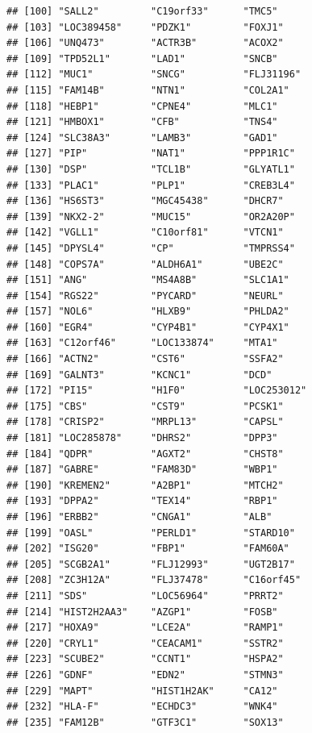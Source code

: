 \documentclass{article}\usepackage[]{graphicx}\usepackage[]{color}
\makeatletter
\newenvironment{kframe}{%
 \def\at@end@of@kframe{}%
 \ifinner\ifhmode%
  \def\at@end@of@kframe{\end{minipage}}%
  \begin{minipage}{\columnwidth}%
 \fi\fi%
 \def\FrameCommand##1{\hskip\@totalleftmargin \hskip-\fboxsep
 \colorbox{shadecolor}{##1}\hskip-\fboxsep
     \hskip-\linewidth \hskip-\@totalleftmargin \hskip\columnwidth}%
 \MakeFramed {\advance\hsize-\width
   \@totalleftmargin\z@ \linewidth\hsize
   \@setminipage}}%
 {\par\unskip\endMakeFramed%
 \at@end@of@kframe}
\newenvironment{knitrout}{}{} %
\makeatother
\begin{document}
\begin{knitrout}
\begin{kframe}
\begin{verbatim}
## [100] "SALL2"         "C19orf33"      "TMC5"         
## [103] "LOC389458"     "PDZK1"         "FOXJ1"        
## [106] "UNQ473"        "ACTR3B"        "ACOX2"        
## [109] "TPD52L1"       "LAD1"          "SNCB"         
## [112] "MUC1"          "SNCG"          "FLJ31196"     
## [115] "FAM14B"        "NTN1"          "COL2A1"       
## [118] "HEBP1"         "CPNE4"         "MLC1"         
## [121] "HMBOX1"        "CFB"           "TNS4"         
## [124] "SLC38A3"       "LAMB3"         "GAD1"         
## [127] "PIP"           "NAT1"          "PPP1R1C"      
## [130] "DSP"           "TCL1B"         "GLYATL1"      
## [133] "PLAC1"         "PLP1"          "CREB3L4"      
## [136] "HS6ST3"        "MGC45438"      "DHCR7"        
## [139] "NKX2-2"        "MUC15"         "OR2A20P"      
## [142] "VGLL1"         "C10orf81"      "VTCN1"        
## [145] "DPYSL4"        "CP"            "TMPRSS4"      
## [148] "COPS7A"        "ALDH6A1"       "UBE2C"        
## [151] "ANG"           "MS4A8B"        "SLC1A1"       
## [154] "RGS22"         "PYCARD"        "NEURL"        
## [157] "NOL6"          "HLXB9"         "PHLDA2"       
## [160] "EGR4"          "CYP4B1"        "CYP4X1"       
## [163] "C12orf46"      "LOC133874"     "MTA1"         
## [166] "ACTN2"         "CST6"          "SSFA2"        
## [169] "GALNT3"        "KCNC1"         "DCD"          
## [172] "PI15"          "H1F0"          "LOC253012"    
## [175] "CBS"           "CST9"          "PCSK1"        
## [178] "CRISP2"        "MRPL13"        "CAPSL"        
## [181] "LOC285878"     "DHRS2"         "DPP3"         
## [184] "QDPR"          "AGXT2"         "CHST8"        
## [187] "GABRE"         "FAM83D"        "WBP1"         
## [190] "KREMEN2"       "A2BP1"         "MTCH2"        
## [193] "DPPA2"         "TEX14"         "RBP1"         
## [196] "ERBB2"         "CNGA1"         "ALB"          
## [199] "OASL"          "PERLD1"        "STARD10"      
## [202] "ISG20"         "FBP1"          "FAM60A"       
## [205] "SCGB2A1"       "FLJ12993"      "UGT2B17"      
## [208] "ZC3H12A"       "FLJ37478"      "C16orf45"     
## [211] "SDS"           "LOC56964"      "PRRT2"        
## [214] "HIST2H2AA3"    "AZGP1"         "FOSB"         
## [217] "HOXA9"         "LCE2A"         "RAMP1"        
## [220] "CRYL1"         "CEACAM1"       "SSTR2"        
## [223] "SCUBE2"        "CCNT1"         "HSPA2"        
## [226] "GDNF"          "EDN2"          "STMN3"        
## [229] "MAPT"          "HIST1H2AK"     "CA12"         
## [232] "HLA-F"         "ECHDC3"        "WNK4"         
## [235] "FAM12B"        "GTF3C1"        "SOX13"        

\end{verbatim}
\end{kframe}
\end{knitrout}
\end{document}
